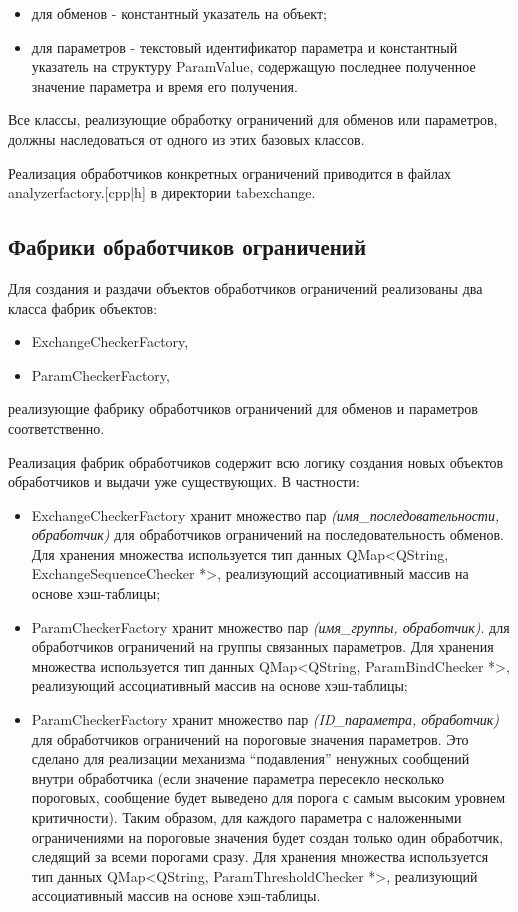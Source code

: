 \begin{itemize}
 \item для обменов - константный указатель на объект;
 \item для параметров - текстовый идентификатор параметра и константный 
указатель на структуру ParamValue, содержащую последнее полученное значение 
параметра и время его получения.
\end{itemize}

Все классы, реализующие обработку ограничений для обменов или параметров, 
должны наследоваться от одного из этих базовых классов.

Реализация обработчиков конкретных ограничений приводится в файлах 
analyzerfactory.[cpp|h] в директории tabexchange.

\subsection{Фабрики обработчиков ограничений}

Для создания и раздачи объектов обработчиков ограничений реализованы два класса 
фабрик объектов:

\begin{itemize}
 \item ExchangeCheckerFactory,
 \item ParamCheckerFactory,
\end{itemize}

реализующие фабрику обработчиков ограничений для обменов и параметров 
соответственно.

Реализация фабрик обработчиков содержит всю логику создания новых объектов 
обработчиков и выдачи уже существующих. В частности:

\begin{itemize}
 \item ExchangeCheckerFactory хранит множество пар 
\textit{(имя\_последовательности, обработчик)} для обработчиков ограничений на 
последовательность обменов. Для хранения множества используется тип данных 
QMap<QString, ExchangeSequenceChecker *>, реализующий ассоциативный массив на 
основе хэш-таблицы;
 \item ParamCheckerFactory хранит множество пар \textit{(имя\_группы, 
обработчик)}. для обработчиков ограничений на группы связанных параметров. Для 
хранения множества используется тип данных QMap<QString, ParamBindChecker *>, 
реализующий ассоциативный массив на основе хэш-таблицы;
 \item ParamCheckerFactory хранит множество пар \textit{(ID\_параметра, 
обработчик)} для обработчиков ограничений на пороговые значения параметров. Это 
сделано для реализации механизма ``подавления'' ненужных сообщений внутри 
обработчика (если значение параметра пересекло несколько пороговых, сообщение 
будет выведено для порога с самым высоким уровнем критичности). Таким образом, 
для каждого параметра с наложенными ограничениями на пороговые значения будет 
создан только один обработчик, следящий за всеми порогами сразу. Для хранения 
множества используется тип данных QMap<QString, ParamThresholdChecker *>, 
реализующий ассоциативный массив на основе хэш-таблицы.
\end{itemize}

